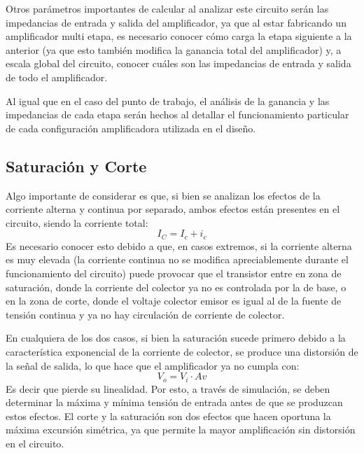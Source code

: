 Otros parámetros importantes de calcular al analizar este circuito serán las impedancias de entrada y salida del amplificador, ya que al estar fabricando un amplificador multi etapa, es necesario conocer cómo carga la etapa siguiente a la anterior (ya que esto también modifica la ganancia total del amplificador) y, a escala global del circuito, conocer cuáles son las impedancias de entrada y salida de todo el amplificador.

Al igual que en el caso del punto de trabajo, el análisis de la ganancia y las impedancias de cada etapa serán hechos al detallar el funcionamiento particular de cada configuración amplificadora utilizada en el diseño.

\subsection{Saturación y Corte} %

Algo importante de considerar es que, si bien se analizan los efectos de la corriente alterna y continua por separado, ambos efectos están presentes en el circuito, siendo la corriente total:
\begin{equation}
    I_C = I_c + i_c
    \label{IC}
    \end{equation}
Es necesario conocer esto debido a que, en casos extremos, si la corriente alterna es muy elevada (la corriente continua no se modifica apreciablemente durante el funcionamiento del circuito) puede provocar que el transistor entre en zona de saturación, donde la corriente del colector ya no es controlada por la de base, o en la zona de corte, donde el voltaje colector emisor es igual al de la fuente de tensión continua y ya no hay circulación de corriente de colector.

En cualquiera de los dos casos, si bien la saturación sucede primero debido a la característica exponencial de la corriente de colector, se produce una distorsión de la señal de salida, lo que hace que el amplificador ya no cumpla con:
\begin{equation}
    V_o = V_i \cdot Av
    \label{amplificaion}
    \end{equation}
Es decir que pierde su linealidad. Por esto, a través de simulación, se deben determinar la máxima y mínima tensión de entrada antes de que se produzcan estos efectos. El corte y la saturación son dos efectos que hacen oportuna la máxima excursión simétrica, ya que permite la mayor amplificación sin distorsión en el circuito.

